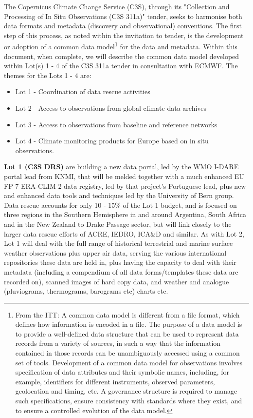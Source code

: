 \documentclass[a4paper]{article}
\begin{document}
The Copernicus Climate Change Service (C3S), through its "Collection and Processing of In Situ Observations (C3S 311a)" tender, seeks to harmonise both data formats and metadata (discovery and observational) conventions. The first step of this process, as noted within the invitation to tender, is the development or adoption of a common data model\footnote{From the ITT: A common data model is different from a file format, which defines how information is encoded in a file. The purpose of a data model is to provide a well-defined data structure that can be used to represent data records from a variety of sources, in such a way that the information contained in those records can be unambiguously accessed using a common set of tools. Development of a common data model for observations involves specification of data attributes and their symbolic names, including, for example, identifiers for different instruments, observed parameters, geolocation and timing, etc. A governance structure is required to manage such specifications, ensure consistency with standards where they exist, and to ensure a controlled evolution of the data model.} for the data and metadata. Within this document, when complete, we will describe the common data model developed within Lot(s) 1 - 4 of the C3S 311a tender in consultation with ECMWF. The themes for the Lots 1 - 4 are:\\
\begin{itemize}
\item Lot 1 - Coordination of data rescue activities
\item Lot 2 - Access to observations from global climate data archives
\item Lot 3 - Access to observations from baseline and reference networks
\item Lot 4 - Climate monitoring products for Europe based on in situ observations.
\end{itemize}
\textbf{Lot 1 (C3S DRS)} are building a new data portal, led by the WMO I-DARE portal lead from KNMI, that will be melded together with a much enhanced EU FP 7 ERA-CLIM 2 data registry, led by that project's Portuguese lead, plus new and enhanced data tools and techniques led by the University of Bern group. Data rescue accounts for only 10 - 15\% of the Lot 1 budget, and is focused on three regions in the Southern Hemisphere in and around Argentina, South Africa and in the New Zealand to Drake Passage sector, but will link closely to the larger data rescue efforts of ACRE, IEDRO, ICA\&D and similar. As with Lot 2, Lot 1 will deal with the full range of historical terrestrial and marine surface weather observations plus upper air data, serving the various international repositories these data are held in, plus having the capacity to deal with their metadata (including a compendium of all data forms/templates these data are recorded on), scanned images of hard copy data, and weather and analogue (pluviograms, thermograms, barograms etc) charts etc.\\
\end{document}
